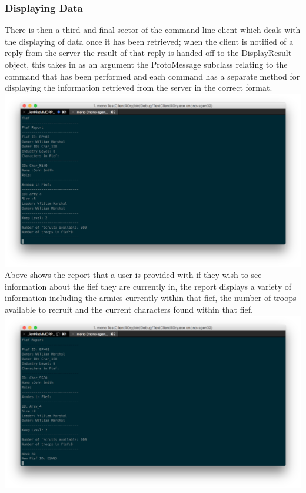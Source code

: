 \documentclass{article}
\begin{document}
\subsubsection{Displaying Data}
There is then a third and final sector of the command line client which deals with the displaying of data once it has been retrieved; when the client is notified of a reply from the server the result of that reply is handed off to the DisplayResult object, this takes in as an argument the ProtoMessage subclass relating to the command that has been performed and each command has a separate method for displaying the information retrieved from the server in the correct format.\\
\includegraphics[width=\textwidth]{text3.png}
Above shows the report that a user is provided with if they wish to see information about the fief they are currently in, the report displays a variety of information including the armies currently within that fief, the number of troops available to recruit and the current characters found within that fief.\\
\includegraphics[width=\textwidth]{text4.png}
\end{document}
